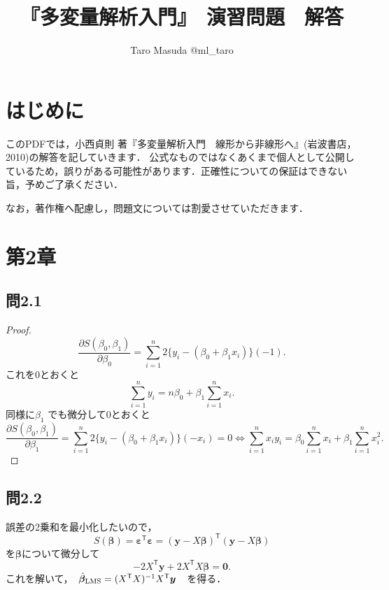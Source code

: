\documentclass[pdflatex,ja=standard]{bxjsarticle}
\title{『多変量解析入門』　演習問題　解答}
\author{Taro Masuda @ml\_taro}
\begin{document}
\maketitle

\section{はじめに}
このPDFでは，小西貞則 著『多変量解析入門　線形から非線形へ』(岩波書店，2010)の解答を記していきます．
公式なものではなくあくまで個人として公開しているため，誤りがある可能性があります．正確性についての保証はできない旨，予めご了承ください．

なお，著作権へ配慮し，問題文については割愛させていただきます．

\section{第2章}

\subsection{問2.1}

\begin{proof}
\begin{equation}
\frac{\partial S(\beta_{0}, \beta_{1})}{\partial \beta_{0}} =  \sum_{i=1}^{n} 2 \{ y_i - ( \beta_0 + \beta_1 x_i )  \}  (-1) .
\end{equation}
これを0とおくと
\begin{equation}
\sum_{i=1}^{n} y_i = n \beta_0 + \beta_1 \sum_{i=1}^{n} x_i. 
\end{equation}
同様に$\beta_1$ でも微分して0とおくと
\begin{equation}
\frac{\partial S(\beta_{0}, \beta_{1})}{\partial \beta_{1}} =  \sum_{i=1}^{n} 2 \{ y_i - ( \beta_0 + \beta_1 x_i )  \} (-x_i) = 0
\iff \sum_{i=1}^{n} x_i y_i =  \beta_0 \sum_{i=1}^{n} x_i + \beta_1 \sum_{i=1}^{n} x_i^2.
\end{equation}
\end{proof}

\subsection{問2.2}
誤差の2乗和を最小化したいので，
\begin{equation}
S(\bm{\beta}) = \bm{\varepsilon}^{\mathsf{T}} \bm{\varepsilon} = (\bm{y} - X \bm{\beta})^{\mathsf{T}} (\bm{y} - X \bm{\beta})
\end{equation}
を$\bm{\beta}$について微分して
\begin{equation}
- 2 X^{\mathsf{T}} \bm{y} + 2 X^{\mathsf{T}}X \bm{\beta} = \bm{0}. 
\end{equation}
これを解いて，　$\hat{\bm{\beta}}_{\rm{LMS}} = (X^{\mathsf{T}} X)^{-1} X^{\mathsf{T}} \bm{y}$　を得る．
\end{document}
